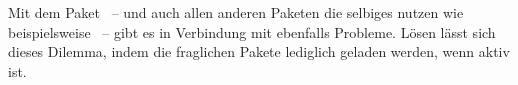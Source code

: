 Mit dem Paket ~-- und auch allen anderen Paketen die 
selbiges nutzen wie beispielsweise ~-- gibt es in Verbindung 
mit  ebenfalls Probleme. Lösen lässt sich dieses Dilemma, 
indem die fraglichen Pakete lediglich geladen werden, wenn  
aktiv ist.
%
\begin{quoting}[rightmargin=0pt]
\begin{Code}
\ifpdf
  \usepackage{tikz}%
\fi
\end{Code}
\end{quoting}
